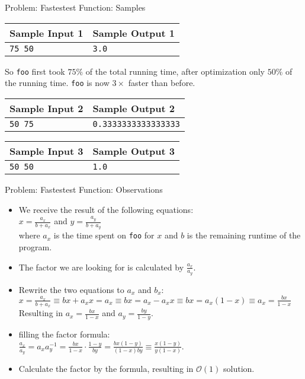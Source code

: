 \documentclass[11pt,pdf, aspectratio=169]{beamer}
\begin{document}
  \begin{frame}{Problem: Fastestest Function: Samples}
    \begin{tabular}{|l|l|}
      \hline
      \textbf{Sample Input 1} & \textbf{Sample Output 1} \\
      \hline
      \texttt{75 50}          & \texttt{3.0}             \\
      \hline
    \end{tabular}

    So \texttt{foo} first took $75\%$ of the total running time, after optimization only $50\%$ of the running time.
    \texttt{foo} is now $3\times$ faster than before.


    \begin{tabular}{|l|l|}
      \hline
      \textbf{Sample Input 2} & \textbf{Sample Output 2}    \\
      \hline
      \texttt{50 75}          & \texttt{0.3333333333333333} \\
      \hline
    \end{tabular}


    \begin{tabular}{|l|l|}
      \hline
      \textbf{Sample Input 3} & \textbf{Sample Output 3} \\
      \hline
      \texttt{50 50}          & \texttt{1.0}             \\
      \hline
    \end{tabular}
  \end{frame}
  \begin{frame}{Problem: Fastestest Function: Observations}
    \begin{itemize}
      \item<1-> We receive the result of the following equations:\\$x=\frac{a_x}{b+a_x}$ and $y=\frac{a_y}{b+a_y}$\\ where $a_x$ is the time spent on \texttt{foo} for $x$ and $b$ is the remaining runtime of the program.
      \item<2-> The factor we are looking for is calculated by $\frac{a_x}{a_y}$.
      \item<3-> Rewrite the two equations to $a_x$ and $b_x$:\\$x=\frac{a_x}{b+a_x} \equiv bx+a_{x}x = a_x \equiv bx = a_x - a_{x}x \equiv bx = a_x(1-x) \equiv a_x = \frac{bx}{1-x}$\\ Resulting in $a_x=\frac{bx}{1-x}$ and $a_y=\frac{by}{1-y}$.
      \item<4-> filling the factor formula:\\ $\frac{a_x}{a_y}= a_{x}a_{y}^{-1} = \frac{bx}{1-x}\cdot\frac{1-y}{by} = \frac{bx(1-y)}{(1-x)by} \equiv \frac{x(1-y)}{y(1-x)}$.
      \item<4-> Calculate the factor by the formula, resulting in $\mathcal{O}(1)$ solution.
    \end{itemize}
  \end{frame}
\end{document}
